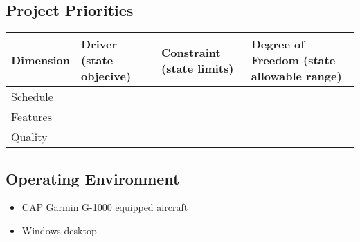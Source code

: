 \documentclass[12pt, letterpaper]{article}
\begin{document}
\subsection{Project Priorities}

\begin{tabular} { |l|l|l|l| }
\hline
Dimension & Driver \newline (state objecive) & Constraint \newline(state limits) & Degree of Freedom \newline(state allowable range) \\
\hline
\hline
Schedule & & & \\ \hline
Features & & & \\ \hline
Quality & & & \\
\hline
\end{tabular}

\subsection{Operating Environment}

\begin{itemize}
	\item CAP Garmin G-1000 equipped aircraft
	\item Windows desktop
\end{itemize}

{}

\end{document}
